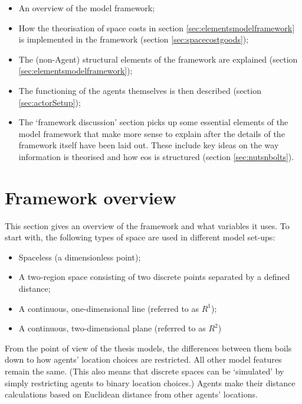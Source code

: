 \begin{itemize}
	\item An overview of the model framework;	
\item How the theorisation of space costs in section \ref{sec:elementsmodelframework} is implemented in the framework (section \ref{sec:spacecostgoods});
	\item The (non-Agent) structural elements of the framework are explained (section \ref{sec:elementsmodelframework});
	\item The functioning of the agents themselves is then described (section \ref{sec:actorSetup});
	\item The `framework discussion' section picks up some essential elements of the model framework that make more sense to explain after the details of the framework itself have been laid out. These include key ideas on the way information is theorised and how \gls{eos} is structured (section \ref{sec:nutsnbolts}).
\end{itemize}

\section{Framework overview \label{sec:elementsmodelframework}}

This section gives an overview of the framework and what variables it uses. To start with, the following types of space are used in different model set-ups:

\begin{itemize}	
\item Spaceless (a dimensionless point); 
\item A two-region space consisting of two discrete points separated by a defined distance; 
\item A continuous, one-dimensional line (referred to as $R^1$);
\item A continuous, two-dimensional plane (referred to as $R^2$)		 
\end{itemize}

From the point of view of the thesis models, the differences between them boils down to how agents' location choices are restricted. All other model features remain the same. (This also means that discrete spaces can be `simulated' by simply restricting agents to binary location choices.) Agents make their distance calculations based on Euclidean distance from other agents' locations. 

